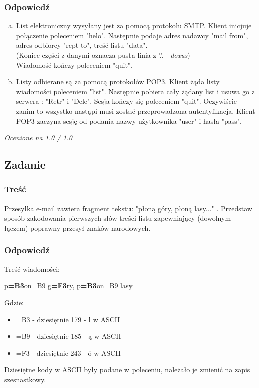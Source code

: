 		\subsubsection{Odpowiedź}
			\begin{enumerate}[a)]
				\item List elektroniczny wysyłany jest za pomocą protokołu SMTP. Klient inicjuje połączenie poleceniem "helo". Następnie podaje adres nadawcy "mail from", adres odbiorcy "rcpt to", treść listu "data". 
				\\(Koniec części z danymi oznacza pusta linia z '.'. - \textit{doxus}) 
				\\Wiadomość kończy poleceniem "quit".
				\item Listy odbierane są za pomocą protokołów POP3. Klient żąda listy wiadomości poleceniem "list". Następnie pobiera cały żądany list i usuwa go z serwera : "Retr" i "Dele". Sesja kończy się poleceniem "quit". Oczywiście zanim to wszystko nastąpi musi zostać przeprowadzona autentyfikacja. Klient POP3 zaczyna sesję od podania nazwy użytkownika "user" i hasła "pass".
			\end{enumerate}
			\small{ \emph{Ocenione na 1.0 / 1.0}}
	
	\subsection{Zadanie}
		\subsubsection{Treść}
			Przesyłka e-mail zawiera fragment tekstu: "płoną góry, płoną lasy..." . Przedstaw sposób zakodowania pierwszych słów treści listu zapewniający (dowolnym łączem) poprawny przesył znaków narodowych.
		\subsubsection{Odpowiedź}
			Treść wiadomości:
			\begin{center}
				p\textbf{=B3}on=B9 g\textbf{=F3}ry, p\textbf{=B3}on=B9 lasy
			\end{center}
			Gdzie:
			\begin{itemize}
				\item =B3 - dziesiętnie 179 - ł w ASCII
				\item =B9 - dziesiętnie 185 - ą w ASCII
				\item =F3 - dziesiętnie 243 - ó w ASCII
			\end{itemize}
			Dziesiętne kody w ASCII były podane w poleceniu, należało je zmienić na zapis szesnastkowy.
			